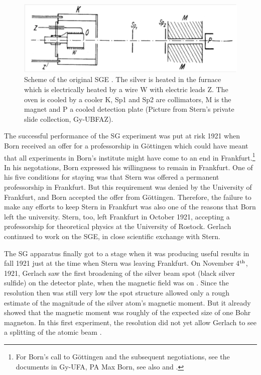 \documentclass[12pt]{article}
\begin{document}
\begin{figure}
\begin{center}
\includegraphics[scale=0.5]{figures/SGE_original_scheme}
\caption{Scheme of the original SGE \cite[p.~677]{GerlachWEtal1924Richtungsquantelung}. The silver is heated in the furnace which is electrically heated by a wire W with electric leads Z. The oven is cooled by a cooler K, Sp1 and Sp2 are collimators, M is the magnet and P a cooled detection plate (Picture from Stern's private slide collection, Gy-UBFAZ).}
\label{fig:SGEorigscheme}
\end{center}
\end{figure}

The successful performance of the SG experiment was put at risk 1921 when Born received an offer for a professorship in Göttingen which could have meant that all experiments in Born's institute might have come to an end in Frankfurt.\footnote{For Born's call to G\"ottingen and the subsequent negotiations, see the documents in Gy-UFA, PA Max Born, see also \cite[esp.~Docs.~75, 95]{CPAE10} and \citep{DahmsHJ2002Politics}.}
In his negotations, Born expressed his willingness to remain in Frankfurt. One of his five conditions for staying was that Stern was offered a permanent professorship in Frankfurt. But this requirement was denied by the University of Frankfurt, and Born accepted the offer from Göttingen. Therefore, the failure to make any efforts to keep Stern in Frankfurt was also one of the reasons that Born left the university. Stern, too, left Frankfurt in October 1921, accepting a professorship for theoretical physics at the University of Rostock. Gerlach continued to work on the SGE, in close scientific exchange with Stern. 

The SG apparatus finally got to a stage when it was producing useful results in fall 1921 just at the time when Stern was leaving Frankfurt. On November 4$^{\rm th}$, 1921, Gerlach saw the first broadening of the silver beam spot (black silver sulfide) on the detector plate, when the magnetic field was on \citep{GerlachWEtal1921Nachweis,GerlachW1969Stern,GerlachW1969Entdeckung}. Since the resolution then was still very low the spot structure allowed only a rough estimate of the magnitude of the silver atom's magnetic moment. But it already showed that the magnetic moment was roughly of the expected size of one Bohr magneton. In this first experiment, the resolution did not yet allow Gerlach to see a splitting of the atomic beam \citep{GerlachWEtal1921Nachweis}.    
\end{document}
